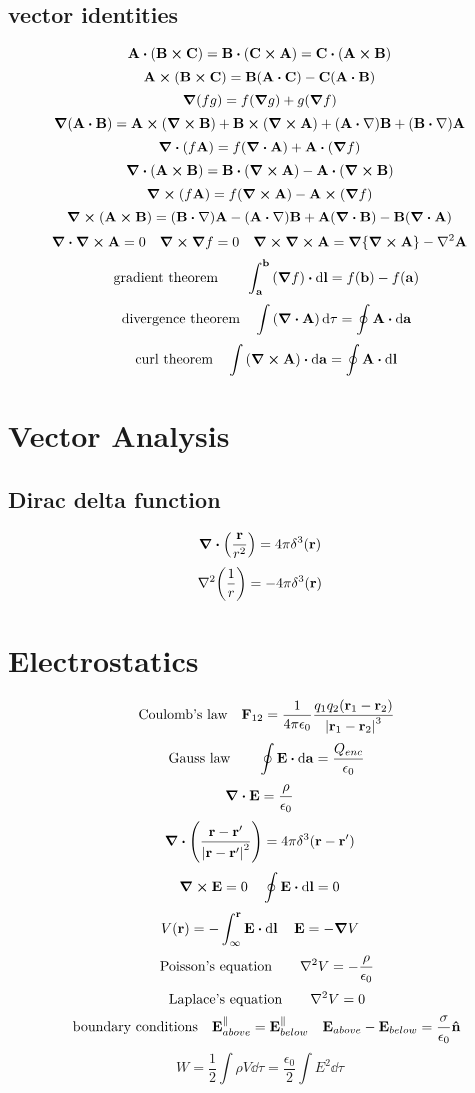 \documentclass[12pt]{article}
\begin{document}
\subsection*{vector identities}
\[\vb{A}\vdot\qty(\vb{B}\cp\vb{C})=\vb{B}\vdot\qty(\vb{C}\cp\vb{A})=\vb{C}\vdot\qty(\vb{A}\cp\vb{B})\]
\[\vb{A}\cp\qty(\vb{B}\cp\vb{C})=\vb{B}\qty(\vb{A}\vdot\vb{C})-\vb{C}\qty(\vb{A}\vdot\vb{B})\]
\[\grad{(fg)}=f(\grad{g})+g(\grad{f})\]
\[\grad{(\vb{A}\vdot\vb{B})}=\vb{A}\cp\qty(\curl{\vb{B}})+\vb{B}\cp\qty(\curl{\vb{A}})+\qty(\vb{A}\vdot\nabla)\vb{B}+\qty(\vb{B}\vdot\nabla)\vb{A}\]
\[\div{\qty(f\vb{A})}=f(\div{\vb{A}})+\vb{A}\vdot\qty(\grad{f})\]
\[\div{\qty(\vb{A}\cp\vb{B})}=\vb{B}\vdot\qty(\curl{\vb{A}})-\vb{A}\vdot\qty(\curl{\vb{B}})\]
\[\curl{\qty(f\vb{A})}=f(\curl{\vb{A}})-\vb{A}\cp\qty(\grad{f})\]
\[\curl{(\vb{A}\cp\vb{B})}=\qty(\vb{B}\vdot\nabla)\vb{A}-\qty(\vb{A}\vdot\nabla)\vb{B}+\vb{A}\qty(\div{\vb{B}})-\vb{B}\qty(\div{\vb{A}})\]
\[\div{\curl{\vb{A}}}=0\quad\curl{\grad{f}}=0\quad\curl{\curl{\vb{A}}}=\grad\qty{\curl{\vb{A}}}-\laplacian{\vb{A}}\]
\[\qq{gradient theorem}\quad \int_{\vb{a}}^{\vb{b}}\qty(\grad{f})\vdot\dd{\vb{l}}=f(\vb{b})-f(\vb{a})\]
\[\qq{divergence theorem} \int\qty(\div{\vb{A}})\dd{\tau}=\oint\vb{A}\vdot\dd{\vb{a}}\]
\[\qq{curl theorem} \int\qty(\curl{\vb{A}})\vdot\dd{\vb{a}}=\oint\vb{A}\vdot\dd{\vb{l}}\]
\section{Vector Analysis}
\subsection*{Dirac delta function}
\[\div{\qty(\frac{\vb{r}}{r^2})}=4\pi\delta^3(\vb{r})\]
\[\laplacian{\qty(\frac{1}{r})}=-4\pi\delta^3(\vb{r})\]
\section{Electrostatics}
\[\qq{Coulomb's law}\vb{F}_{12}=\frac{1}{4\pi\epsilon_0}\frac{q_1q_2(\vb{r}_1-\vb{r}_2)}{\vqty{\vb{r}_1-\vb{r}_2}^3}\]
\[\qq{Gauss law}\quad \oint\vb{E}\vdot\dd{\vb{a}}=\frac{Q_{enc}}{\epsilon_0}\]
\[\div{\vb{E}}=\frac{\rho}{\epsilon_0}\]
\[\div{\qty(\frac{\vb{r}-\vb{r}'}{\vqty{\vb{r}-\vb{r}'}^2})}=4\pi\delta^3(\vb{r}-\vb{r}')\]
\[\curl{\vb{E}}=0\quad \oint\vb{E}\vdot\dd{\vb{l}}=0\]
\[V(\vb{r})=-\int_{\infty}^{\vb{r}}\vb{E}\vdot\dd{\vb{l}}\quad\vb{E}=-\grad{V}\]
\[\qq{Poisson's equation}\quad\laplacian{V}=-\frac{\rho}{\epsilon_0}\]
\[\qq{Laplace's equation} \quad\laplacian{V}=0\]
\[\qq{boundary conditions} \vb{E}^{\parallel}_{above}=\vb{E}^{\parallel}_{below}\quad \vb{E}_{above}-\vb{E}_{below}=\frac{\sigma}{\epsilon_0}\vu{n} \]
\[W=\frac{1}{2}\int\rho{V}\dd{\tau}=\frac{\epsilon_0}{2}\int{E^2}\dd\tau\]
\end{document}
